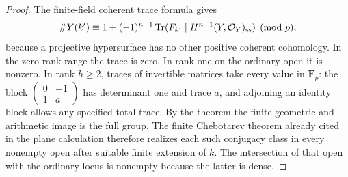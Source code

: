 \begin{proof}
The finite-field coherent trace formula gives
\[
 \#Y(k')\equiv 1+(-1)^{n-1}
       \operatorname{Tr}(F_{k'}\mid H^{n-1}(Y,\mathcal O_Y)_{\rm ss})
       \pmod p,
\]
because a projective hypersurface has no other positive
coherent cohomology.  In the zero-rank range the trace is zero.
In rank one on the ordinary open it is nonzero.
In rank $h\geq2$, traces of invertible matrices take every
value in $\mathbf F_p$: the block
$\begin{pmatrix}0&-1\\1&a\end{pmatrix}$ has determinant one
and trace $a$, and adjoining an identity block allows any
specified total trace.  By the theorem the finite geometric
and arithmetic image is the full group.  The finite
Chebotarev theorem already cited in the plane calculation
therefore realizes each such conjugacy class in every
nonempty open after suitable finite extension of $k$.
The intersection of that open with the ordinary locus is
nonempty because the latter is dense.
\end{proof}
